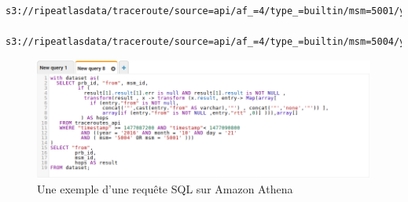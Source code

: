 \begin{lstlisting}[basicstyle= \footnotesize]
s3://ripeatlasdata/traceroute/source=api/af_=4/type_=builtin/msm=5001/year=2016/month=10/day=21

s3://ripeatlasdata/traceroute/source=api/af_=4/type_=builtin/msm=5004/year=2016/month=10/day=21
\end{lstlisting}



\begin{figure}[H]
	\centering
	\includegraphics[width=1\linewidth]{illustrations/sqlRequestAthena.png}
	\caption{Une exemple d'une requête SQL sur Amazon Athena}
	\label{fig:sqlrequestathena}
\end{figure}



